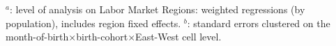 \begin{landscape}
\begin{table}[htbp]
\begin{minipage}{0.72\linewidth}
		\hspace*{15 pt}$^a$: level of analysis on Labor Market Regions: weighted regressions (by population), includes region fixed effects.\newline
		\hspace*{15 pt}$^b$: standard errors clustered on the month-of-birth$\times$birth-cohort$\times$East-West cell level.
	\end{minipage}
\end{table} 
	\vspace*{\fill}\clearpage
\end{landscape}






